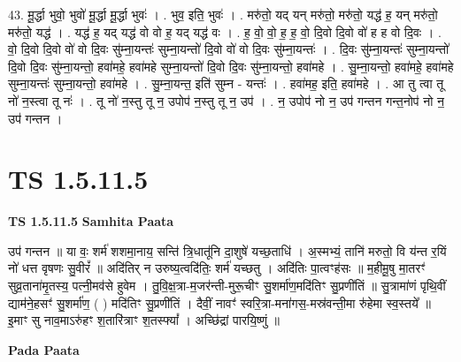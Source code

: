 \documentclass[17pt]{extarticle}
\begin{document}
43. मू॒र्द्धा भुवो॒ भुवो॑ मू॒र्द्धा मू॒र्द्धा भुवः॑ । . भुव॒ इति॒ भुवः॑ । . मरु॑तो॒ यद् यन् मरु॑तो॒ मरु॑तो॒ यद्ध॑ ह॒ यन् मरु॑तो॒ मरु॑तो॒ यद्ध॑ । . यद्ध॑ ह॒ यद् यद्ध॑ वो वो ह॒ यद् यद्ध॑ वः । . ह॒ वो॒ वो॒ ह॒ ह॒ वो॒ दि॒वो दि॒वो वो॑ ह ह वो दि॒वः । . वो॒ दि॒वो दि॒वो वो॑ वो दि॒वः सु॑म्ना॒यन्तः॑ सुम्ना॒यन्तो॑ दि॒वो वो॑ वो दि॒वः सु॑म्ना॒यन्तः॑ । . दि॒वः सु॑म्ना॒यन्तः॑ सुम्ना॒यन्तो॑ दि॒वो दि॒वः सु॑म्ना॒यन्तो॒ हवा॑महे॒ हवा॑महे सुम्ना॒यन्तो॑ दि॒वो दि॒वः सु॑म्ना॒यन्तो॒ हवा॑महे । . सु॒म्ना॒यन्तो॒ हवा॑महे॒ हवा॑महे सुम्ना॒यन्तः॑ सुम्ना॒यन्तो॒ हवा॑महे । . सु॒म्ना॒यन्त॒ इति॑ सुम्न - यन्तः॑ । . हवा॑मह॒ इति॒ हवा॑महे । . आ तु त्वा तू नो॑ न॒स्त्वा तू नः॑ । . तू नो॑ न॒स्तु तू न॒ उपोप॑ न॒स्तु तू न॒ उप॑ । . न॒ उपोप॑ नो न॒ उप॑ गन्तन गन्त॒नोप॑ नो न॒ उप॑ गन्तन । \newline
\pagebreak
{}
\section*{ TS 1.5.11.5 }

\textbf{TS 1.5.11.5 } \newline
\textbf{Samhita Paata} \newline

उप॑ गन्तन ॥ या वः॒ शर्म॑ शशमा॒नाय॒ सन्ति॑ त्रि॒धातू॑नि दा॒शुषे॑ यच्छ॒ताधि॑ । अ॒स्मभ्यं॒ तानि॑ मरुतो॒ वि य॑न्त र॒यिं नो॑ धत्त वृषणः सु॒वीरं᳚ ॥ अदि॑तिर् न उरुष्य॒त्वदि॑तिः॒ शर्म॑ यच्छतु । अदि॑तिः पा॒त्वꣳह॑सः ॥ म॒हीमू॒षु मा॒तरꣳ॑ सुव्र॒ताना॑मृ॒तस्य॒ पत्नी॒मव॑से हुवेम । तु॒वि॒क्ष॒त्रा-म॒जर॑न्ती-मुरू॒चीꣳ सु॒शर्मा॑ण॒मदि॑तिꣳ सु॒प्रणी॑तिं ॥ सु॒त्रामा॑णं पृथि॒वीं द्याम॑ने॒हसꣳ॑ सु॒शर्मा॑ण॒ ( ) मदि॑तिꣳ सु॒प्रणी॑तिं । दैवीं॒ नावꣳ॑ स्वरि॒त्रा-मना॑गस॒-मस्र॑वन्ती॒मा रु॑हेमा स्व॒स्तये᳚ ॥ इ॒माꣳ सु नाव॒माऽरु॑हꣳ श॒तारि॑त्राꣳ श॒तस्फ्यां᳚ । अच्छि॑द्रां पारयि॒ष्णुं ॥ \newline

\textbf{Pada Paata} \newline
\end{document}
